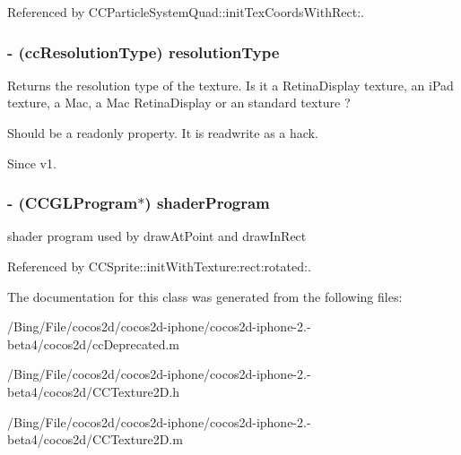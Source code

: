 Referenced by C\-C\-Particle\-System\-Quad\-::init\-Tex\-Coords\-With\-Rect\-:.

\hypertarget{class_c_c_texture2_d_ace9dffd6f51333af7c82f5f0afbf35f5}{
\subsubsection[{resolution\-Type}]{\setlength{\rightskip}{0pt plus 5cm}-\/ ({\bf cc\-Resolution\-Type}) {\bf resolution\-Type}}}\label{class_c_c_texture2_d_ace9dffd6f51333af7c82f5f0afbf35f5}
Returns the resolution type of the texture. Is it a Retina\-Display texture, an i\-Pad texture, a Mac, a Mac Retina\-Display or an standard texture ?

Should be a readonly property. It is readwrite as a hack.

\begin{DoxySince}{Since}
v1. 
\end{DoxySince}
\hypertarget{class_c_c_texture2_d_af6b133645d399a04495267235bf0651a}{
\subsubsection[{shader\-Program}]{\setlength{\rightskip}{0pt plus 5cm}-\/ ({\bf C\-C\-G\-L\-Program}$\ast$) {\bf shader\-Program}}}\label{class_c_c_texture2_d_af6b133645d399a04495267235bf0651a}
shader program used by draw\-At\-Point and draw\-In\-Rect 

Referenced by C\-C\-Sprite\-::init\-With\-Texture\-:rect\-:rotated\-:.



The documentation for this class was generated from the following files\-:\begin{DoxyCompactItemize}
\item 
/\-Bing/\-File/cocos2d/cocos2d-\/iphone/cocos2d-\/iphone-\/2.-\/beta4/cocos2d/cc\-Deprecated.\-m\item 
/\-Bing/\-File/cocos2d/cocos2d-\/iphone/cocos2d-\/iphone-\/2.-\/beta4/cocos2d/C\-C\-Texture2\-D.\-h\item 
/\-Bing/\-File/cocos2d/cocos2d-\/iphone/cocos2d-\/iphone-\/2.-\/beta4/cocos2d/C\-C\-Texture2\-D.\-m\end{DoxyCompactItemize}
